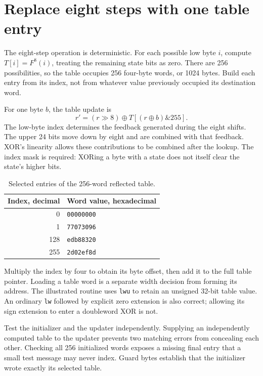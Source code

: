 \section{Replace eight steps with one table entry}
The eight-step operation is deterministic. For each possible low byte \(i\), compute
\(T[i]=F^8(i)\), treating the remaining state bits as zero. There are 256 possibilities,
so the table occupies 256 four-byte words, or 1024 bytes. Build each entry from its
index, not from whatever value previously occupied its destination word.

For one byte \(b\), the table update is
\[
 r'=(r\mathbin{\gg}8)\mathbin{\oplus}
 T[(r\mathbin{\oplus}b)\mathbin{\&}255].
\]
The low-byte index determines the feedback generated during the eight shifts. The
upper 24 bits move down by eight and are combined with that feedback. XOR's linearity
allows these contributions to be combined after the lookup. The index mask is required:
XORing a byte with a state does not itself clear the state's higher bits.

\begin{table}[htbp]
\centering
\caption{Selected entries of the 256-word reflected table.}
\begin{tabular}{rl}
\toprule
Index, decimal & Word value, hexadecimal\\
\midrule
0 & \texttt{00000000}\\
1 & \texttt{77073096}\\
128 & \texttt{edb88320}\\
255 & \texttt{2d02ef8d}\\
\bottomrule
\end{tabular}
\end{table}

Multiply the index by four to obtain its byte offset, then add it to the full table
pointer. Loading a table word is a separate width decision from forming its address.
The illustrated routine uses \texttt{lwu} to retain an unsigned 32-bit table value.
An ordinary \texttt{lw} followed by explicit zero extension is also correct; allowing
its sign extension to enter a doubleword XOR is not.

Test the initializer and the updater independently. Supplying an independently computed
table to the updater prevents two matching errors from concealing each other. Checking
all 256 initialized words exposes a missing final entry that a small test message may
never index. Guard bytes establish that the initializer wrote exactly its selected table.
